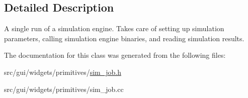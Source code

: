 \subsection{Detailed Description}
A single run of a simulation engine. Takes care of setting up simulation parameters, calling simulation engine binaries, and reading simulation results. 

The documentation for this class was generated from the following files\+:\begin{DoxyCompactItemize}
\item 
src/gui/widgets/primitives/\hyperlink{sim__job_8h}{sim\+\_\+job.\+h}\item 
src/gui/widgets/primitives/sim\+\_\+job.\+cc\end{DoxyCompactItemize}
